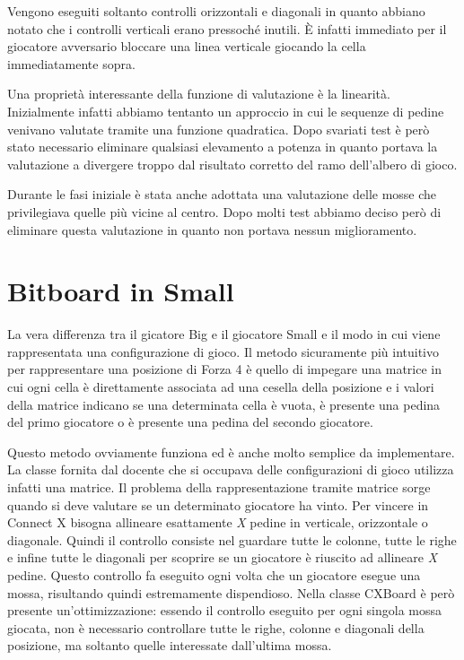 \documentclass[a4paper]{article}
\begin{document}
Vengono eseguiti soltanto controlli orizzontali e diagonali in quanto abbiano 
notato che i controlli verticali erano pressoché inutili. È infatti immediato 
per il giocatore avversario bloccare una linea verticale giocando la cella
immediatamente sopra.

Una proprietà interessante della funzione di valutazione è la linearità. 
Inizialmente infatti abbiamo tentanto un approccio in cui le sequenze di pedine 
venivano valutate tramite una funzione quadratica. Dopo svariati test è però 
stato necessario eliminare qualsiasi elevamento a potenza in quanto portava la 
valutazione a divergere troppo dal risultato corretto del ramo dell'albero di 
gioco.

Durante le fasi iniziale è stata anche adottata una valutazione delle mosse che
privilegiava quelle più vicine al centro. Dopo molti test abbiamo deciso però di
eliminare questa valutazione in quanto non portava nessun miglioramento.

\section{Bitboard in Small}
\label{sec_bitboard}
La vera differenza tra il gicatore Big e il giocatore Small e il modo in cui
viene rappresentata una configurazione di gioco. Il metodo sicuramente più
intuitivo per rappresentare una posizione di Forza 4 è quello di impegare una 
matrice in cui ogni cella è direttamente associata ad una cesella della 
posizione e i valori della matrice indicano se una determinata cella è vuota, 
è presente una pedina del primo giocatore o è presente una pedina del secondo 
giocatore.

Questo metodo ovviamente funziona ed è anche molto semplice da implementare. La
classe fornita dal docente che si occupava delle configurazioni di gioco 
utilizza infatti una matrice. Il problema della rappresentazione tramite matrice
sorge quando si deve valutare se un determinato giocatore ha vinto. Per vincere
in Connect X bisogna allineare esattamente \emph{X} pedine in verticale, 
orizzontale o diagonale. Quindi il controllo consiste nel guardare tutte le 
colonne, tutte le righe e infine tutte le diagonali per scoprire se un giocatore
è riuscito ad allineare \emph{X} pedine. Questo controllo fa eseguito ogni volta
che un giocatore esegue una mossa, risultando quindi estremamente dispendioso.
Nella classe CXBoard è però presente un'ottimizzazione: essendo il controllo 
eseguito per ogni singola mossa giocata, non è necessario controllare tutte le
righe, colonne e diagonali della posizione, ma soltanto quelle interessate 
dall'ultima mossa.
\end{document}
